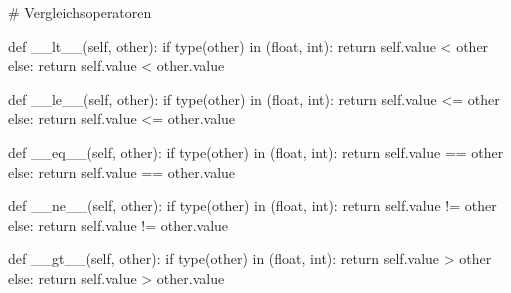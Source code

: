 \documentclass[
  a4paper,
  DIV=11]{scrreprt}
\newenvironment{Shaded}{\begin{snugshade}}{\end{snugshade}}
\newcommand{\BuiltInTok}[1]{\textcolor[rgb]{0.00,0.23,0.31}{#1}}
\newcommand{\CommentTok}[1]{\textcolor[rgb]{0.37,0.37,0.37}{#1}}
\newcommand{\ControlFlowTok}[1]{\textcolor[rgb]{0.00,0.23,0.31}{#1}}
\newcommand{\FunctionTok}[1]{\textcolor[rgb]{0.28,0.35,0.67}{#1}}
\newcommand{\KeywordTok}[1]{\textcolor[rgb]{0.00,0.23,0.31}{#1}}
\newcommand{\NormalTok}[1]{\textcolor[rgb]{0.00,0.23,0.31}{#1}}
\newcommand{\OperatorTok}[1]{\textcolor[rgb]{0.37,0.37,0.37}{#1}}
\newcommand{\VariableTok}[1]{\textcolor[rgb]{0.07,0.07,0.07}{#1}}
\theoremstyle{definition}
\theoremstyle{definition}
\theoremstyle{remark}
\begin{document}
\begin{Shaded}
\begin{Highlighting}[]
\CommentTok{\# Vergleichsoperatoren }

\KeywordTok{def} \FunctionTok{\_\_lt\_\_}\NormalTok{(}\VariableTok{self}\NormalTok{, other):}
    \ControlFlowTok{if} \BuiltInTok{type}\NormalTok{(other) }\KeywordTok{in}\NormalTok{ (}\BuiltInTok{float}\NormalTok{, }\BuiltInTok{int}\NormalTok{):}
        \ControlFlowTok{return} \VariableTok{self}\NormalTok{.value }\OperatorTok{\textless{}}\NormalTok{ other}
    \ControlFlowTok{else}\NormalTok{:}
        \ControlFlowTok{return} \VariableTok{self}\NormalTok{.value }\OperatorTok{\textless{}}\NormalTok{ other.value}

\KeywordTok{def} \FunctionTok{\_\_le\_\_}\NormalTok{(}\VariableTok{self}\NormalTok{, other):}
    \ControlFlowTok{if} \BuiltInTok{type}\NormalTok{(other) }\KeywordTok{in}\NormalTok{ (}\BuiltInTok{float}\NormalTok{, }\BuiltInTok{int}\NormalTok{):}
        \ControlFlowTok{return} \VariableTok{self}\NormalTok{.value }\OperatorTok{\textless{}=}\NormalTok{ other}
    \ControlFlowTok{else}\NormalTok{:}
        \ControlFlowTok{return} \VariableTok{self}\NormalTok{.value }\OperatorTok{\textless{}=}\NormalTok{ other.value}

\KeywordTok{def} \FunctionTok{\_\_eq\_\_}\NormalTok{(}\VariableTok{self}\NormalTok{, other):}
    \ControlFlowTok{if} \BuiltInTok{type}\NormalTok{(other) }\KeywordTok{in}\NormalTok{ (}\BuiltInTok{float}\NormalTok{, }\BuiltInTok{int}\NormalTok{):}
        \ControlFlowTok{return} \VariableTok{self}\NormalTok{.value }\OperatorTok{==}\NormalTok{ other}
    \ControlFlowTok{else}\NormalTok{:}
        \ControlFlowTok{return} \VariableTok{self}\NormalTok{.value }\OperatorTok{==}\NormalTok{ other.value}

\KeywordTok{def} \FunctionTok{\_\_ne\_\_}\NormalTok{(}\VariableTok{self}\NormalTok{, other):}
    \ControlFlowTok{if} \BuiltInTok{type}\NormalTok{(other) }\KeywordTok{in}\NormalTok{ (}\BuiltInTok{float}\NormalTok{, }\BuiltInTok{int}\NormalTok{):}
        \ControlFlowTok{return} \VariableTok{self}\NormalTok{.value }\OperatorTok{!=}\NormalTok{ other}
    \ControlFlowTok{else}\NormalTok{:}
        \ControlFlowTok{return} \VariableTok{self}\NormalTok{.value }\OperatorTok{!=}\NormalTok{ other.value}

\KeywordTok{def} \FunctionTok{\_\_gt\_\_}\NormalTok{(}\VariableTok{self}\NormalTok{, other):}
    \ControlFlowTok{if} \BuiltInTok{type}\NormalTok{(other) }\KeywordTok{in}\NormalTok{ (}\BuiltInTok{float}\NormalTok{, }\BuiltInTok{int}\NormalTok{):}
        \ControlFlowTok{return} \VariableTok{self}\NormalTok{.value }\OperatorTok{\textgreater{}}\NormalTok{ other}
    \ControlFlowTok{else}\NormalTok{:}
        \ControlFlowTok{return} \VariableTok{self}\NormalTok{.value }\OperatorTok{\textgreater{}}\NormalTok{ other.value}


\end{Highlighting}
\end{Shaded}
\end{document}
